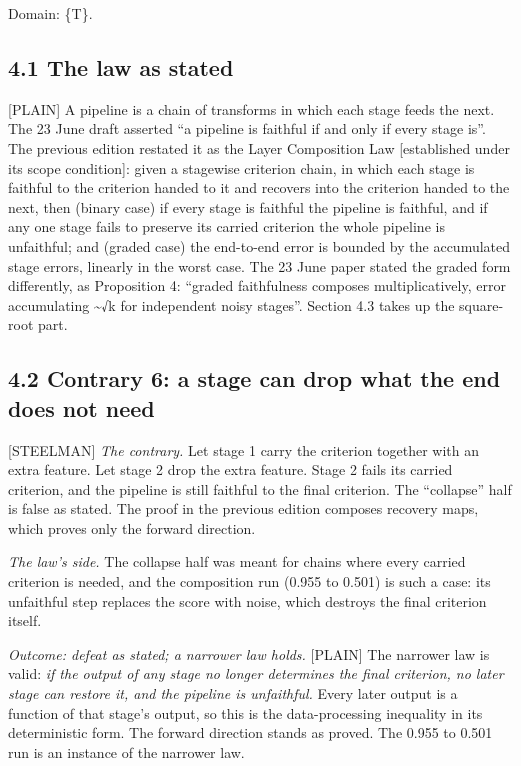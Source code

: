 \documentclass[11pt]{article}
\newcommand{\register}[1]{{\ttfamily\small #1}}
\begin{document}
Domain: \{T\}.

\subsection*{4.1 The law as stated}

\register{[PLAIN]} A pipeline is a chain of transforms in which each stage feeds the next. The 23 June draft asserted ``a pipeline is faithful if and only if every stage is''. The previous edition restated it as the Layer Composition Law [established under its scope condition]: given a stagewise criterion chain, in which each stage is faithful to the criterion handed to it and recovers into the criterion handed to the next, then (binary case) if every stage is faithful the pipeline is faithful, and if any one stage fails to preserve its carried criterion the whole pipeline is unfaithful; and (graded case) the end-to-end error is bounded by the accumulated stage errors, linearly in the worst case. The 23 June paper stated the graded form differently, as Proposition 4: ``graded faithfulness composes multiplicatively, error accumulating \textasciitilde{}√k for independent noisy stages''. Section 4.3 takes up the square-root part.

\subsection*{4.2 Contrary 6: a stage can drop what the end does not need}

\register{[STEELMAN]} \emph{The contrary.} Let stage 1 carry the criterion together with an extra feature. Let stage 2 drop the extra feature. Stage 2 fails its carried criterion, and the pipeline is still faithful to the final criterion. The ``collapse'' half is false as stated. The proof in the previous edition composes recovery maps, which proves only the forward direction.

\emph{The law's side.} The collapse half was meant for chains where every carried criterion is needed, and the composition run (0.955 to 0.501) is such a case: its unfaithful step replaces the score with noise, which destroys the final criterion itself.

\emph{Outcome: defeat as stated; a narrower law holds.} \register{[PLAIN]} The narrower law is valid: \emph{if the output of any stage no longer determines the final criterion, no later stage can restore it, and the pipeline is unfaithful.} Every later output is a function of that stage's output, so this is the data-processing inequality in its deterministic form. The forward direction stands as proved. The 0.955 to 0.501 run is an instance of the narrower law.
\end{document}
